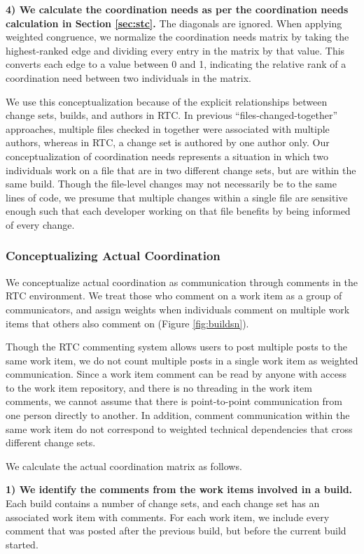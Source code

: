 \documentclass[12pt,oneside]{book}
\begin{document}
\textbf{4) We calculate the coordination needs as per the coordination needs calculation in Section \ref{sec:stc}.} The diagonals are ignored. When applying weighted congruence, we normalize the coordination needs matrix by taking the highest-ranked edge and dividing every entry in the matrix by that value. This converts each edge to a value between 0 and 1, indicating the relative rank of a coordination need between two individuals in the matrix.

We use this conceptualization because of the explicit relationships between change sets, builds, and authors in RTC. In previous ``files-changed-together'' approaches, multiple files checked in together were associated with multiple authors, whereas in RTC, a change set is authored by one author only. Our conceptualization of coordination needs represents a situation in which two individuals work on a file that are in two different change sets, but are within the same build. Though the file-level changes may not necessarily be to the same lines of code, we presume that multiple changes within a single file are sensitive enough such that each developer working on that file benefits by being informed of every change.

\subsubsection{Conceptualizing Actual Coordination}


We conceptualize actual coordination as communication through comments in the
RTC environment. We treat those who comment on a work item as a group of communicators, and assign weights when individuals comment on multiple work items that others also comment on (Figure \ref{fig:buildsn}).

Though the RTC commenting system allows users to post multiple posts to the same work item, we do not count multiple posts in a single work item as weighted communication.
Since a work item comment can be read by anyone with access to the work item repository, and there is no threading in the work item comments, we cannot assume that there is point-to-point communication from one person directly to another.
In addition, comment communication within the same work item do not correspond to weighted technical dependencies that cross different change sets.

We calculate the actual coordination matrix as follows.

\textbf{1) We identify the comments from the work items involved in a build.} Each build contains a number of change sets, and each change set has an associated work item with comments. For each work item, we include every comment that was posted after the previous build, but before the current build started.
\end{document}
